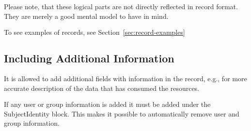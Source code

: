 Please note, that these logical parts are not directly reflected in record 
format. They are merely a good mental model to have in mind.

To see examples of records, see Section~\ref{sec:record-examples}


\subsection{Including Additional Information}

It is allowed to add additional fields with information in the record, e.g.,
for more accurate description of the data that has consumed the resources.

If any user or group information is added it must be added under the
SubjectIdentity block. This makes it possible to automatically remove user
and group information.

